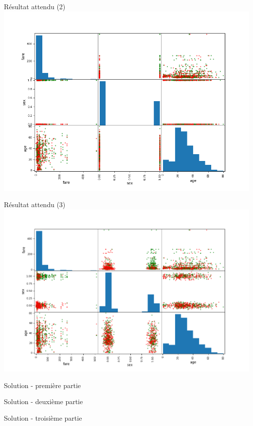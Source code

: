 \documentclass[11pt]{beamer}
\newcommand{\Python}[1]{
	{\small	}
}
\newcommand\Wider[2][3em]{%
\makebox[\linewidth][c]{%
  \begin{minipage}{\dimexpr\textwidth+#1\relax}
  \raggedright#2
  \end{minipage}%
  }%
}
\begin{document}
\begin{frame}{Résultat attendu (2)}
\includegraphics[scale=0.42]{ex206}
\end{frame}

\begin{frame}{Résultat attendu (3)}
\includegraphics[scale=0.42]{ex207}
\end{frame}

\begin{frame}{Solution - première partie}
\Wider{\Python{ex205}}
\end{frame}

\begin{frame}{Solution - deuxième partie}
\Wider{\Python{ex206}}
\end{frame}

\begin{frame}{Solution - troisième partie}
\Wider{\Python{ex207}}
\end{frame}
\end{document}
